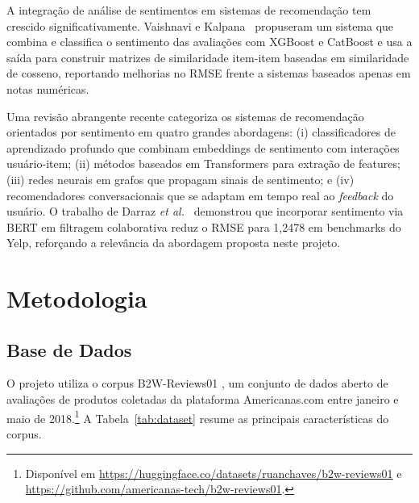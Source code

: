 \documentclass{IEEEtran}
\begin{document}
A integração de análise de sentimentos em sistemas de recomendação tem crescido significativamente. Vaishnavi e Kalpana~\cite{vaishnavi2023sentiment} propuseram um sistema que combina e classifica o sentimento das avaliações com XGBoost e CatBoost e usa a saída para construir matrizes de similaridade item-item baseadas em similaridade de cosseno, reportando melhorias no RMSE frente a sistemas baseados apenas em notas numéricas.


Uma revisão abrangente recente \cite{ahmed2025sentimentaware} categoriza os sistemas de recomendação orientados por sentimento em quatro grandes abordagens: (i) classificadores de aprendizado profundo que combinam embeddings de sentimento com interações usuário-item; (ii) métodos baseados em Transformers para extração de features; (iii) redes neurais em grafos que propagam sinais de sentimento; e (iv) recomendadores conversacionais que se adaptam em tempo real ao \textit{feedback} do usuário. O trabalho de Darraz \textit{et al.}~\cite{sharma2025enhancing} demonstrou que incorporar sentimento via BERT em filtragem colaborativa reduz o RMSE para 1,2478 em benchmarks do Yelp, reforçando a relevância da abordagem proposta neste projeto.


\section{Metodologia}
\label{sec:methodology}

\subsection{Base de Dados}
\label{subsec:dataset}
O projeto utiliza o corpus B2W-Reviews01 \cite{real2019b2w}, um conjunto de dados aberto de avaliações de produtos coletadas da plataforma Americanas.com entre janeiro e maio de 2018.\footnote{Disponível em \url{https://huggingface.co/datasets/ruanchaves/b2w-reviews01} e \url{https://github.com/americanas-tech/b2w-reviews01}.} A Tabela~\ref{tab:dataset} resume as principais características do corpus.
\end{document}
